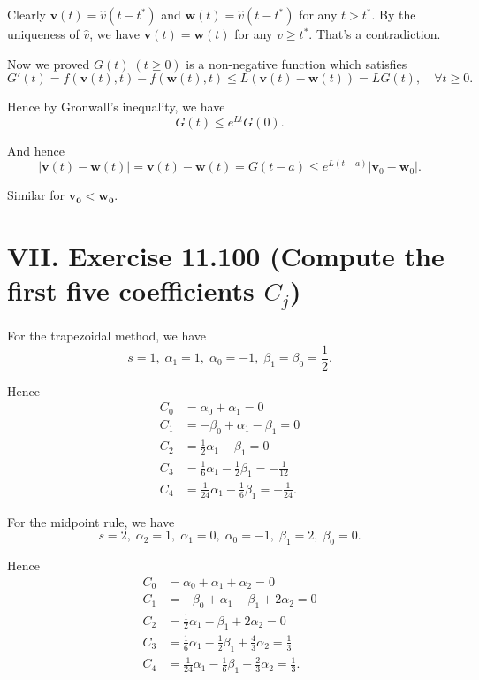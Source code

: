 \documentclass[twoside,a4paper]{article}
\begin{document}
Clearly $\mathbf{v}(t)=\hat{v}(t-t^*)$ and $\mathbf{w}(t)=\hat{v}(t-t^*)$ for any $t>t^*$. By the uniqueness of $\hat{v}$, we have $\mathbf{v}(t)=\mathbf{w}(t)$ for any $v\geq t^*$. That's a contradiction.

Now we proved $G(t)\;(t\geq 0)$ is a non-negative function which satisfies
\begin{equation*}
    G'(t) = f(\mathbf{v}(t),t)-f(\mathbf{w}(t),t) \leq L(\mathbf{v}(t)-\mathbf{w}(t))=LG(t),\quad \forall t\geq 0.
\end{equation*}

Hence by Gronwall's inequality, we have
\begin{equation*}
    G(t)\leq e^{Lt}G(0).
\end{equation*}

And hence
\begin{equation*}
    |\mathbf{v}(t)-\mathbf{w}(t)|=\mathbf{v}(t)-\mathbf{w}(t)=G(t-a)\leq e^{L(t-a)}|\mathbf{v}_0-\mathbf{w}_0|.
\end{equation*}

Similar for $\mathbf{v_0}<\mathbf{w_0}$.

\section*{VII. Exercise 11.100 (Compute the first five coefficients $C_j$)}

\;\;\;\; For the trapezoidal method, we have
\begin{equation*}
    s=1,\;\alpha_1=1,\;\alpha_0=-1,\;\beta_1=\beta_0=\frac{1}{2}.
\end{equation*}

Hence
\begin{align*}
    C_0 &= \alpha_0+\alpha_1=0\\
    C_1 &= -\beta_0+\alpha_1-\beta_1=0\\
    C_2 &= \frac{1}{2}\alpha_1-\beta_1=0\\
    C_3 &= \frac{1}{6}\alpha_1-\frac{1}{2}\beta_1=-\frac{1}{12}\\
    C_4 &= \frac{1}{24}\alpha_1-\frac{1}{6}\beta_1=-\frac{1}{24}.
\end{align*}

For the midpoint rule, we have
\begin{equation*}
    s=2,\;\alpha_2=1,\;\alpha_1=0,\;\alpha_0=-1,\;\beta_1=2,\;\beta_0=0.
\end{equation*}

Hence
\begin{align*}
    C_0 &= \alpha_0+\alpha_1+\alpha_2=0\\
    C_1 &= -\beta_0+\alpha_1-\beta_1+2\alpha_2=0\\
    C_2 &= \frac{1}{2}\alpha_1-\beta_1+2\alpha_2=0\\
    C_3 &= \frac{1}{6}\alpha_1-\frac{1}{2}\beta_1+\frac{4}{3}\alpha_2=\frac{1}{3}\\
    C_4 &= \frac{1}{24}\alpha_1-\frac{1}{6}\beta_1+\frac{2}{3}\alpha_2=\frac{1}{3}.
\end{align*}
\end{document}

